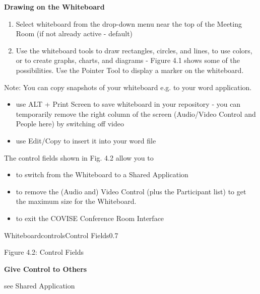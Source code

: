 \vspace{0.5cm}

{\bf Drawing on the Whiteboard}
\vspace{0.5cm}
\begin{enumerate}
\item Select whiteboard from the drop-down menu near the top of the Meeting Room (if not already active -
default)
\item Use the whiteboard tools to draw rectangles, circles, and lines, to use colors, or
to create graphs, charts, and diagrams - Figure 4.1 shows some of the possibilities. Use the Pointer Tool to display a marker on
the whiteboard.
\end{enumerate}

Note: You can copy snapshots of your whiteboard e.g. to your word application.
\begin{itemize}
\item use ALT + Print Screen to save whiteboard in your repository - you can temporarily remove the right
column of the screen (Audio/Video Control and People here) by switching off video 
\item use Edit/Copy to insert it into your word file
\end{itemize}

The control fields shown in Fig. 4.2 allow you to
\begin{itemize}
\item to switch from the Whiteboard to a Shared Application
\item to remove the (Audio and) Video Control (plus the Participant list) to get the maximum size for the
Whiteboard.
\item to exit the COVISE Conference Room Interface
\end{itemize}

\begin{covimg}{Whiteboard}{controls}{Control Fields}{0.7}\end{covimg}
\begin{htmlonly}
Figure 4.2: Control Fields
\vspace{0.5cm}
\end{htmlonly}
\vspace{0.5cm}

\vspace{0.5cm}
{\bf Give Control to Others}
\vspace{0.5cm}

see Shared Application



